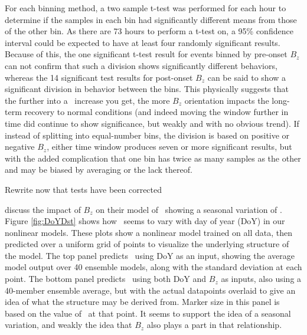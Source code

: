 For each binning method, a two sample t-test was performed for each hour to determine if the samples in each bin had significantly different means from those of the other bin. As there are 73 hours to perform a t-test on, a 95\% confidence interval could be expected to have at least four randomly significant results. Because of this, the one significant t-test result for events binned by pre-onset $B_z$ can not confirm that such a division shows significantly different behaviors, whereas the 14 significant test results for post-onset $B_z$ can be said to show a significant division in behavior between the bins. This physically suggests that the further into a \req\ increase you get, the more $B_z$ orientation impacts the long-term recovery to normal conditions (and indeed moving the window further in time did continue to show significance, but weakly and with no obvious trend). If instead of splitting into equal-number bins, the division is based on positive or negative $B_z$, either time window produces seven or more significant results, but with the added complication that one bin has twice as many samples as the other and may be biased by averaging or the lack thereof. 

\vnote Rewrite now that tests have been corrected

\cite{Temerin2002NewModelPredictionDst} discuss the impact of $B_z$ on their model of \dst\ showing a seasonal variation of \dst. Figure \ref{fig:DoYDst} shows how \dst\ seems to vary with day of year (DoY) in our nonlinear models. These plots show a nonlinear model trained on all data, then predicted over a uniform grid of points to visualize the underlying structure of the model. The top panel predicts \dst\ using DoY as an input, showing the average model output over 40 ensemble models, along with the standard deviation at each point. The bottom panel predicts \dst\ using both DoY and $B_z$ as inputs, also using a 40-member ensemble average, but with the actual datapoints overlaid to give an idea of what the structure may be derived from. Marker size in this panel is based on the value of \dst\ at that point. It seems to support the idea of a seasonal variation, and weakly the idea that $B_z$ also plays a part in that relationship.


